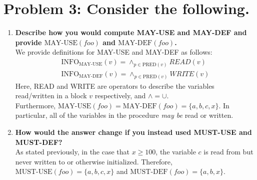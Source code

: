\documentclass[12pt]{article}
\begin{document}
\section*{Problem 3: Consider the following.}
\begin{enumerate}[label=(\alph*)]
\item \textbf{Describe how you would compute MAY-USE and MAY-DEF and provide $\text{MAY-USE}(foo)$ and $\text{MAY-DEF}(foo)$.} \\
  \newline
  We provide definitions for MAY-USE and MAY-DEF as follows:
  \begin{align*}
    \text{INFO}_{\text{MAY-USE}}(v) = \wedge_{p \in \text{PRED}(v)} READ(v) \nonumber \\
    \text{INFO}_{\text{MAY-DEF}}(v) = \wedge_{p \in \text{PRED}(v)} WRITE(v) \nonumber
  \end{align*}
  Here, READ and WRITE are operators to describe the variables read/written in a block $v$ respectively, and $\wedge = \cup$. \\
  \newline
  Furthermore, $\text{MAY-USE}(foo) = \text{MAY-DEF}(foo) = \{a, b, c, x\}$. In particular, all of the variables in the procedure \textit{may be} read or written.
\item \textbf{How would the answer change if you instead used MUST-USE and MUST-DEF?} \\
  \newline
  As stated previously, in the case that $x \geq 100$, the variable $c$ is read from but never written to or otherwise initialized. Therefore, $\text{MUST-USE}(foo) = \{a, b, c, x\}$ and $\text{MUST-DEF}(foo) = \{a, b, x\}$.
\end{enumerate}
\end{document}
